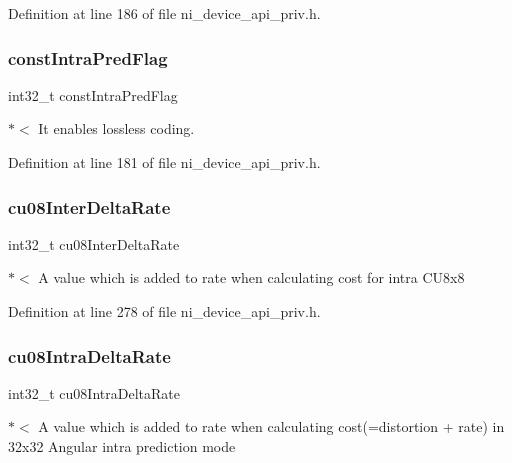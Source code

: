 Definition at line 186 of file ni\+\_\+device\+\_\+api\+\_\+priv.\+h.

\mbox{\label{struct__ni__t408__config__t_a0bcee272b1e72401be02fff9e5c56c6d}} 
\subsubsection{\texorpdfstring{constIntraPredFlag}{constIntraPredFlag}}
{\footnotesize\ttfamily int32\+\_\+t const\+Intra\+Pred\+Flag}

$\ast$$<$ It enables lossless coding. 

Definition at line 181 of file ni\+\_\+device\+\_\+api\+\_\+priv.\+h.

\mbox{\label{struct__ni__t408__config__t_aeaefbdd841a5139d1977a350b2a8b93f}} 
\subsubsection{\texorpdfstring{cu08InterDeltaRate}{cu08InterDeltaRate}}
{\footnotesize\ttfamily int32\+\_\+t cu08\+Inter\+Delta\+Rate}

$\ast$$<$ A value which is added to rate when calculating cost for intra C\+U8x8 

Definition at line 278 of file ni\+\_\+device\+\_\+api\+\_\+priv.\+h.

\mbox{\label{struct__ni__t408__config__t_adcc9dec0bbaca9f29b1c22881d6172ef}} 
\subsubsection{\texorpdfstring{cu08IntraDeltaRate}{cu08IntraDeltaRate}}
{\footnotesize\ttfamily int32\+\_\+t cu08\+Intra\+Delta\+Rate}

$\ast$$<$ A value which is added to rate when calculating cost(=distortion + rate) in 32x32 Angular intra prediction mode 

